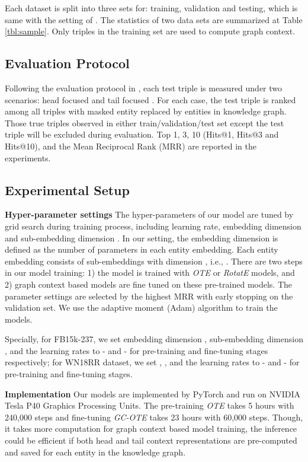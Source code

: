 \documentclass[11pt,a4paper]{article}
\begin{document}
Each dataset is split into three sets for: training, validation and testing, which is same with the setting of \cite{Sun2019RotatEKG}. The statistics of two data sets are summarized at Table \ref{tbl:sample}. Only triples in the training set are used to compute graph context.

\subsection{Evaluation Protocol}
Following the evaluation protocol in \cite{dettmers2017conve,Sun2019RotatEKG}, each test triple  is measured under two scenarios: head focused  and tail focused . For each case, the test triple is ranked among all triples with masked entity replaced by entities in knowledge graph. Those true triples observed in either train/validation/test set except the test triple will be excluded during evaluation.  Top 1, 3, 10 (Hits@1, Hits@3 and Hits@10), and the Mean Reciprocal Rank (MRR) are reported in the experiments.


\subsection{Experimental Setup}

\textbf{Hyper-parameter settings} The hyper-parameters of our model are tuned by grid search during training process, including learning rate, embedding dimension  and sub-embedding dimension . In our setting, the embedding dimension is defined as the number of parameters in each entity embedding. Each entity embedding consists of  sub-embeddings with dimension , i.e., . There are two steps in our model training: 1) the model is trained with {\it OTE} or {\it RotatE} models, and 2) graph context based models are fine tuned on these pre-trained models. The parameter settings are selected by the highest MRR with early stopping on the validation set. We use the adaptive moment (Adam) algorithm \cite{kingma2014adam} to train the models.

Specially, for FB15k-237, we set embedding dimension , sub-embedding dimension , and the learning rates to - and - for pre-training and fine-tuning stages respectively; for WN18RR dataset, we set , , and the learning rates to - and - for pre-training and fine-tuning stages. 



\noindent\textbf{Implementation} Our models are implemented by PyTorch and run on NVIDIA Tesla P40 Graphics Processing Units. 
The pre-training {\it OTE} takes 5 hours with 240,000 steps and fine-tuning {\it GC-OTE} takes 23 hours with 60,000 steps. Though, it takes more computation for graph context based model training, the inference could be efficient if both head and tail context representations are pre-computed and saved for each entity in the knowledge graph.  
\end{document}
